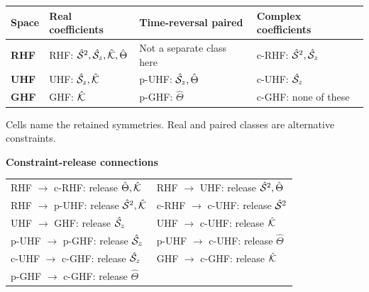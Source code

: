 \begingroup
{\renewcommand{\arraystretch}{1.6}
\begin{tabularx}{\linewidth}{>{\bfseries}lXXX}
\toprule
Space & Real coefficients & Time-reversal paired & Complex coefficients\\
\midrule
\rowcolor{hfGreen!7}
RHF & RHF: $\Hat{\mathcal{S}}^2,\Hat{\mathcal{S}}_z,\Hat{\mathcal{K}},\hat\Theta$&
Not a separate class here&
c-RHF: $\Hat{\mathcal{S}}^2,\Hat{\mathcal{S}}_z$\\
\rowcolor{hfOrange!8}
UHF & UHF: $\Hat{\mathcal{S}}_z,\Hat{\mathcal{K}}$&
p-UHF: $\Hat{\mathcal{S}}_z,\hat\Theta$&
c-UHF: $\Hat{\mathcal{S}}_z$\\
\rowcolor{hfRed!6}
GHF & GHF: $\Hat{\mathcal{K}}$&
p-GHF: $\hat\Theta$&
c-GHF: none of these\\
\bottomrule
\end{tabularx}}
\par\smallskip
{\small Cells name the retained symmetries. Real and paired classes are
alternative constraints.\par}
\par\medskip
{\small\bfseries\color{hfGreenDark}Constraint-release connections\par}\smallskip
{\small\renewcommand{\arraystretch}{1.35}
\begin{tabularx}{\linewidth}{XX}
RHF $\to$ c-RHF: release $\hat\Theta,\Hat{\mathcal{K}}$&
RHF $\to$ UHF: release $\Hat{\mathcal{S}}^2,\hat\Theta$\\
RHF $\to$ p-UHF: release $\Hat{\mathcal{S}}^2,\Hat{\mathcal{K}}$&
c-RHF $\to$ c-UHF: release $\Hat{\mathcal{S}}^2$\\
UHF $\to$ GHF: release $\Hat{\mathcal{S}}_z$&
UHF $\to$ c-UHF: release $\Hat{\mathcal{K}}$\\
p-UHF $\to$ p-GHF: release $\Hat{\mathcal{S}}_z$&
p-UHF $\to$ c-UHF: release $\hat\Theta$\\
c-UHF $\to$ c-GHF: release $\Hat{\mathcal{S}}_z$&
GHF $\to$ c-GHF: release $\Hat{\mathcal{K}}$\\
p-GHF $\to$ c-GHF: release $\hat\Theta$&
\end{tabularx}}
\endgroup
